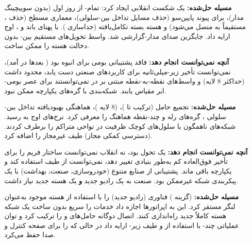 \textbf{مسیله حل‌شده:}  یک شکست انقلابی ایجاد کرد: تمام- از روز اول (بدون سوییچینگ مدار)،  برای پیوند پایین‌سو (حذف مسایل تداخل بین-سلولی)، معماری مسطح (حذف ،  مستقیماً به  متصل می‌شود) و هسته بسته تکامل‌یافته (جداسازی ). با پهنای باند  و ،  اوج  ارایه داد.  جایگزین صدای مدار-گزارشی شد. واسط  تحویل‌های مستقیم بین- بدون دخالت هسته را ممکن ساخت.

\textbf{آنچه نمی‌توانست انجام دهد:}  فاقد پشتیبانی بومی برای  انبوه بود ( بعدها در  آمد)، نمی‌توانست تأخیر زیر-میلی‌ثانیه برای کاربردهای صنعتی دست یابد،  محدود داشت (حداکثر 8 لایه) و واسط‌های نقطه-به-نقطه مبتنی بر  در  نمی‌توانستند برای عصر بومی-ابر مقیاس یابند. شبکه‌بندی با گره‌های یکپارچه  ممکن نبود.


\textbf{مسیله حل‌شده:}  تجمیع حامل (ترکیب تا )،  (8 لایه )، هماهنگی بهبودیافته تداخل بین-سلولی ، گره‌های رله و چند-نقطه هماهنگ  را معرفی کرد. نرخ‌های اوج به  رسید. شبکه‌های ناهمگون  با سلول‌های کوچک ظرفیت در نواحی متراکم را برطرف کردند.  (دسترسی کمکی مجاز) طیف غیرمجاز را اضافه کرد.

\textbf{آنچه نمی‌توانست انجام دهد:}  یک تحول بود، نه انقلاب  نمی‌توانست ساختار فریم را برای تأخیر فوق‌العاده کم به‌طور بنیادی تغییر دهد، نمی‌توانست از طیف  استفاده کند و  یکپارچه باقی ماند. پشتیبانی از صنایع متنوع (خودروسازی، صنعت، بهداشت) با یک پیکربندی شبکه غیرممکن بود. صنعت به یک رادیو جدید \textbf{و} یک هسته جدید نیاز داشت.


\textbf{مسیله حل‌شده:}  (گزینه ) فناوری  (رادیو جدید) را با استفاده از هسته  موجود  به‌عنوان لنگر مستقر کرد. این به اپراتورها اجازه داد خدمات  را سریع بدون ساخت یک شبکه هسته کاملاً جدید راه‌اندازی کنند. اتصال دوگانه  حامل‌های  و  را ترکیب کرد و توان عملیاتی چند- با استفاده از  و طیف  زیر- ارایه داد در حالی که  را برای صفحه کنترل و صدا  حفظ می‌کرد.

